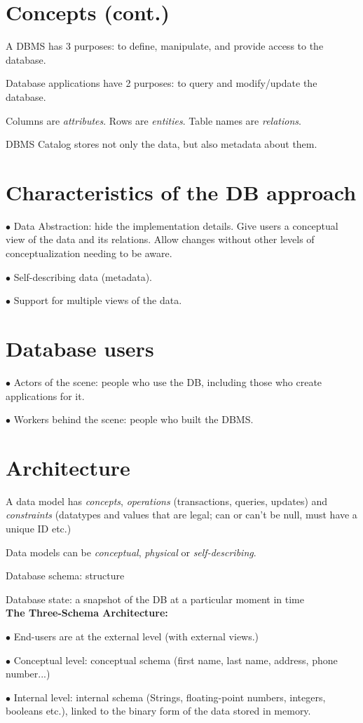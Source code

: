 \documentclass[english]{exam}
\begin{document}
	
    \section{Concepts (cont.)}
    
    A DBMS has 3 purposes: to define, manipulate, and provide access to the database.
    
    Database applications have 2 purposes: to query and modify/update the database.
    
    Columns are \textit{attributes}. Rows are \textit{entities}. Table names are \textit{relations}.
    
    DBMS Catalog stores not only the data, but also metadata about them.
    
    \section{Characteristics of the DB approach}
    
    $\bullet$ Data Abstraction: hide the implementation details. Give users a conceptual view of the data and its relations. Allow changes without other levels of conceptualization needing to be aware.
    
    $\bullet$ Self-describing data (metadata).
    
    $\bullet$ Support for multiple views of the data.
    
    \section{Database users}
    
    $\bullet$ Actors of the scene: people who use the DB, including those who create applications for it.
    
    $\bullet$ Workers behind the scene: people who built the DBMS.
    
    \section{Architecture}
    
    A data model has \textit{concepts}, \textit{operations} (transactions, queries, updates) and \textit{constraints} (datatypes and values that are legal; can or can't be null, must have a unique ID etc.)
    
    Data models can be \textit{conceptual}, \textit{physical} or \textit{self-describing}.
    
    Database schema: structure
    
    Database state: a snapshot of the DB at a particular moment in time\\
    
    \textbf{The Three-Schema Architecture: }
    
    $\bullet$ End-users are at the external level (with external views.) 
    
    $\bullet$ Conceptual level: conceptual schema  (first name, last name, address, phone number...)
    
    $\bullet$ Internal level: internal schema (Strings, floating-point numbers, integers, booleans etc.), linked to the binary form of the data stored in memory.
    
    
\end{document}
